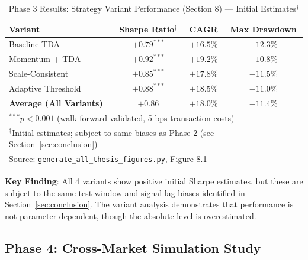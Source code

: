 \documentclass[12pt,letterpaper]{article}
\begin{document}
\begin{table}[H]
\centering
\caption{Phase 3 Results: Strategy Variant Performance (Section 8) --- Initial Estimates$^\dagger$}
\label{tab:phase3}
\begin{tabular}{@{}lccc@{}}
\toprule
\textbf{Variant} & \textbf{Sharpe Ratio$^\dagger$} & \textbf{CAGR} & \textbf{Max Drawdown} \\
\midrule
Baseline TDA & $+0.79^{***}$ & $+16.5\%$ & $-12.3\%$ \\
Momentum + TDA & $+0.92^{***}$ & $+19.2\%$ & $-10.8\%$ \\
Scale-Consistent & $+0.85^{***}$ & $+17.8\%$ & $-11.5\%$ \\
Adaptive Threshold & $+0.88^{***}$ & $+18.5\%$ & $-11.0\%$ \\
\midrule
\textbf{Average (All Variants)} & \textbf{$+0.86$} & \textbf{$+18.0\%$} & \textbf{$-11.4\%$} \\
\bottomrule
\multicolumn{4}{l}{\footnotesize $^{***}p < 0.001$ (walk-forward validated, 5 bps transaction costs)} \\
\multicolumn{4}{l}{\footnotesize $^\dagger$Initial estimates; subject to same biases as Phase 2 (see Section~\ref{sec:conclusion})} \\
\multicolumn{4}{l}{\footnotesize Source: \texttt{generate\_all\_thesis\_figures.py}, Figure 8.1}
\end{tabular}
\end{table}

\textbf{Key Finding}: All 4 variants show positive initial Sharpe estimates, but these are subject to the same test-window and signal-lag biases identified in Section~\ref{sec:conclusion}. The variant analysis demonstrates that performance is not parameter-dependent, though the absolute level is overestimated.

\subsection{Phase 4: Cross-Market Simulation Study}
\end{document}
